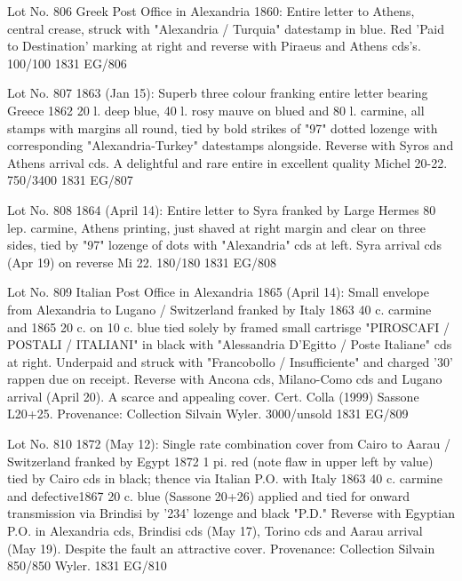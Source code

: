 \documentclass[justified]{tufte-book}
\begin{document}





%
{Lot No. 806
Greek Post Office in Alexandria 1860: Entire letter to Athens, central crease, struck with "Alexandria / Turquia" datestamp in blue. Red 'Paid to Destination' marking at right and reverse with Piraeus and Athens cds's. 100/100}%
{1831}%
{EG/806}%
{}%
{}
{}%
{}

%
{Lot No. 807
1863 (Jan 15): Superb three colour franking entire letter bearing Greece 1862 20 l. deep blue, 40 l. rosy mauve on blued and 80 l. carmine, all stamps with margins all round, tied by bold strikes of "97" dotted lozenge with corresponding "Alexandria-Turkey" datestamps alongside. Reverse with Syros and Athens arrival cds. A delightful and rare entire in excellent quality Michel 20-22. 750/3400}%
{1831}%
{EG/807}%
{}%
{}
{}%
{}

%
{Lot No. 808
1864 (April 14): Entire letter to Syra franked by Large Hermes 80 lep. carmine, Athens printing, just shaved at right margin and clear on three sides, tied by "97" lozenge of dots with "Alexandria" cds at left. Syra arrival cds (Apr 19) on reverse Mi 22. 
180/180}%
{1831}%
{EG/808}%
{}%
{}
{}%
{}

%
{Lot No. 809
Italian Post Office in Alexandria 1865 (April 14): Small envelope from Alexandria to Lugano / Switzerland franked by Italy 1863 40 c. carmine and 1865 20 c. on 10 c. blue tied solely by framed small cartrisge "PIROSCAFI / POSTALI / ITALIANI" in black with "Alessandria D'Egitto / Poste Italiane" cds at right. Underpaid and struck with "Francobollo / Insufficiente" and charged '30' rappen due on receipt. Reverse with Ancona cds, Milano-Como cds and Lugano arrival (April 20). A scarce and appealing cover. Cert. Colla (1999) Sassone L20+25. Provenance: Collection Silvain Wyler. 3000/unsold}%
{1831}%
{EG/809}%
{}%
{}
{}%
{}

%
{
Lot No. 810
1872 (May 12): Single rate combination cover from Cairo to Aarau / Switzerland franked by Egypt 1872 1 pi. red (note flaw in upper left by value) tied by Cairo cds in black; thence via Italian P.O. with Italy 1863 40 c. carmine and defective1867 20 c. blue (Sassone 20+26) applied and tied for onward transmission via Brindisi by '234' lozenge and black "P.D." Reverse with Egyptian P.O. in Alexandria cds, Brindisi cds (May 17), Torino cds and Aarau arrival (May 19). Despite the fault an attractive cover. Provenance: Collection Silvain 850/850 Wyler.
}%
{1831}%
{EG/810}%
{}%
{}
{}%
{}
\end{document}
